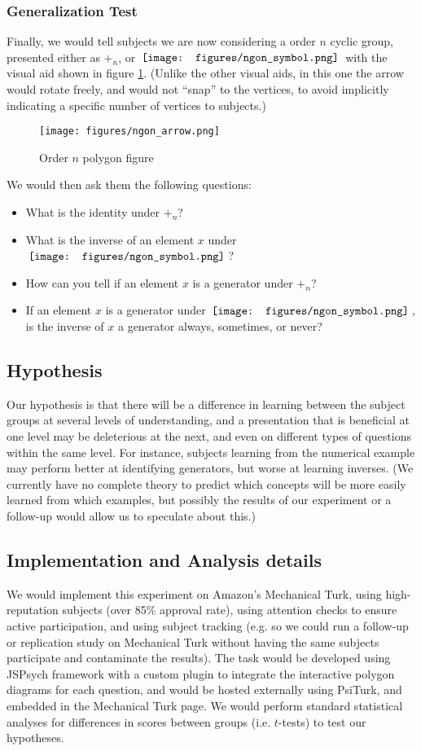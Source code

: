 \documentclass[11pt]{article}
\newcommand{\ngon}{\,\vcenter{\hbox{\texttt{[image: figures/ngon\_symbol.png]}}}\,}
\begin{document}
\subsubsection{Generalization Test}
Finally, we would tell subjects we are now considering a order $n$ cyclic group, presented either as $+_n$, or $\ngon$ with the visual aid shown in figure \ref{ngonex}. (Unlike the other visual aids, in this one the arrow would rotate freely, and would not ``snap'' to the vertices, to avoid implicitly indicating a specific number of vertices to subjects.) 
\begin{figure}[H] \centering \texttt{[image: figures/ngon\_arrow.png]} \caption{Order $n$ polygon figure} \label{ngonex} \end{figure} \noindent
We would then ask them the following questions: 
\begin{itemize}
\item What is the identity under $+_n$?
\item What is the inverse of an element $x$ under $\ngon$?
\item How can you tell if an element $x$ is a generator under $+_n$?
\item If an element $x$ is a generator under $\ngon$, is the inverse of $x$ a generator always, sometimes, or never?
\end{itemize}
\subsection{Hypothesis}
Our hypothesis is that there will be a difference in learning between the subject groups at several levels of understanding, and a presentation that is beneficial at one level may be deleterious at the next, and even on different types of questions within the same level. For instance, subjects learning from the numerical example may perform better at identifying generators, but worse at learning inverses. (We currently have no complete theory to predict which concepts will be more easily learned from which examples, but possibly the results of our experiment or a follow-up would allow us to speculate about this.)
\subsection{Implementation and Analysis details}
We would implement this experiment on Amazon's Mechanical Turk, using high-reputation subjects (over 85\% approval rate), using attention checks to ensure active participation, and using subject tracking (e.g. so we could run a follow-up or replication study on Mechanical Turk without having the same subjects participate and contaminate the results). The task would be developed using JSPsych framework with a custom plugin to integrate the interactive polygon diagrams for each question, and would be hosted externally using PsiTurk, and embedded in the Mechanical Turk page. We would perform standard statistical analyses for differences in scores between groups (i.e. $t$-tests) to test our hypotheses. 
\end{document}
